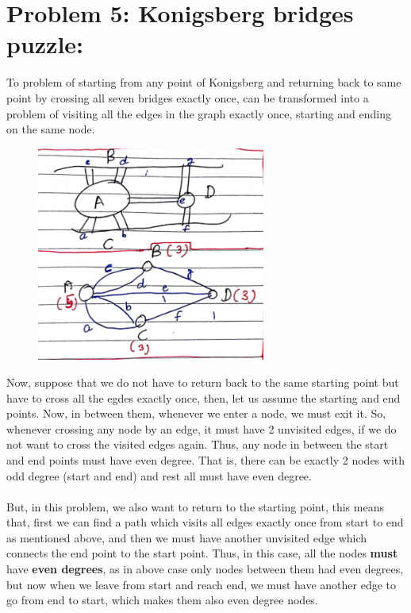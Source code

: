 \documentclass[12pt]{report}
\begin{document}
\section{Problem 5: Konigsberg bridges puzzle:}
To problem of starting from any point of Konigsberg and returning back to same point by crossing all seven bridges exactly once, can be transformed into a problem of visiting all the edges in the graph exactly once, starting and ending on the same node.
\begin{figure}[H]
	\vspace{0pt}
	\includegraphics[height = 200pt, keepaspectratio]{Snapshots/q5_1.png}
\end{figure}  
Now, suppose that we do not have to return back to the same starting point but have to cross all the egdes exactly once, then, let us assume the starting and end points. Now, in between them, whenever we enter a node, we must exit it. So, whenever crossing any node by an edge, it must have 2 unvisited edges, if we do not want to cross the visited edges again. Thus, any node in between the start and end points must have even degree.
That is, there can be exactly 2 nodes with odd degree (start and end) and rest all must have even degree. 
\\ \\ 
But, in this problem, we also want to return to the starting point, this means that, first we can find a path which visits all edges exactly once from start to end as mentioned above, and then we must have another unvisited edge which connects the end point to the start point. Thus, in this case, all the nodes \textbf{must} have \textbf{even degrees}, as in above case only nodes between them had even degrees, but now when we leave from start and reach end, we must have another edge to go from end to start, which makes them also even degree nodes.
\end{document}
